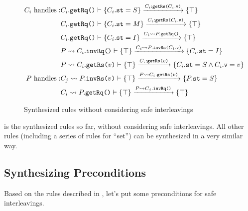 \documentclass[format=manuscript]{acmart}
\begin{document}
\begin{center}
\end{center}

\begin{center}
\end{center}

\begin{figure}
  \begin{eqnarray*}
    C_i\ \textrm{handles}: &
    C_i.\texttt{getRq()}\vdash \{ C_i.\texttt{st} = S \} \xrightarrow{C_i:\texttt{getRs(}C_i.\texttt{v}\texttt{)}} \{ \top \} \\
    & C_i.\texttt{getRq()}\vdash \{ C_i.\texttt{st} = M \} \xrightarrow{C_i:\texttt{getRs(}C_i.\texttt{v}\texttt{)}} \{ \top \} \\
    & C_i.\texttt{getRq()}\vdash \{ C_i.\texttt{st} = I \} \xrightarrow{C_i \leadsto P.\texttt{getRq()}} \{ \top \} \\
    & P \leadsto C_i.\texttt{invRq()}\vdash \{ \top \} \xrightarrow{C_i \leadsto P.\texttt{invRs(}C_i.\texttt{v}\texttt{)}} \{ C_i.\texttt{st} = I \} \\
    & P \leadsto C_i.\texttt{getRs(}v\texttt{)}\vdash \{ \top \} \xrightarrow{C_i:\texttt{getRs(}v\texttt{)}} \{ C_i.\texttt{st} = S \wedge C_i.\texttt{v} = v \} \\
    P\ \textrm{handles}: &
    C_j \leadsto P.\texttt{invRs(}v\texttt{)}\vdash \{ \top \} \xrightarrow{P \leadsto C_i.\texttt{getRs(}v\texttt{)}} \{ P.\texttt{st} = S \} \\
    & C_i \leadsto P.\texttt{getRq()}\vdash \{ \top \} \xrightarrow{P \leadsto C_j.\texttt{invRq()}} \{ \top \} \\
  \end{eqnarray*}
  \caption{Synthesized rules without considering safe interleavings}
  \label{fig:synthesized-rules-naive}
\end{figure}

 is the synthesized rules so far, without
considering safe interleavings. All other rules (including a series of rules for
``set'') can be synthesized in a very similar way.

\subsection{Synthesizing Preconditions}

Based on the rules described in , let's put
some preconditions for safe interleavings.
\end{document}
